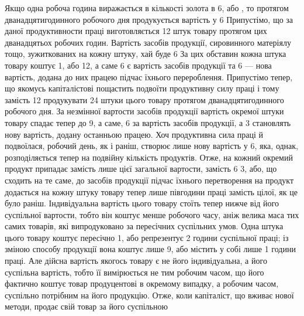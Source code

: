 Якщо одна робоча година виражається в кількості золота
в 6, або , то протягом дванадцятигодинного
робочого дня продукується вартість у 6 Припустімо, що
за даної продуктивности праці виготовляється 12 штук товару
протягом цих дванадцятьох робочих годин. Вартість засобів продукції,
сировинного матеріялу тощо, зужиткованих на кожну
штуку, хай буде 6 За цих обставин кожна штука товару
коштує 1, або 12, а саме 6 є вартість засобів
продукції та 6 — нова вартість, додана до них працею
підчас їхнього перероблення. Припустімо тепер, що якомусь
капіталістові пощастить подвоїти продуктивну силу праці і тому
замість 12 продукувати 24 штуки цього товару протягом дванадцятигодинного
робочого дня. За незмінної вартости засобів
продукції вартість окремої штуки товару спадає тепер до 9,
 а саме, 6 за вартість засобів продукції, а 3 становлять
нову вартість, додану останньою працею. Хоч продуктивна
сила праці й подвоїлася, робочий день, як і раніш, створює
лише нову вартість у 6, яка, однак, розподіляється
тепер на подвійну кількість продуктів. Отже, на кожний окремий
продукт припадає замість  лише  цієї загальної вартости,
замість 6 3, або, що сходить на те саме, до засобів
продукції підчас їхнього перетворення на продукт додається на
кожну штуку товару тепер лише півгодини праці замість цілої,
як це було раніш. Індивідуальна вартість цього товару стоїть
тепер нижче від його суспільної вартости, тобто він коштує менше
робочого часу, аніж велика маса тих самих товарів, які випродуковано
за пересічних суспільних умов. Одна штука цього товару
коштує пересічно 1, або репрезентує 2 години суспільної
праці; із зміною способу продукції вона коштує лише 9,
або містить у собі лише 1 години праці. Але дійсна вартість
якогось товару є не його індивідуальна, а його суспільна вартість,
тобто її вимірюється не тим робочим часом, що його фактично
коштує товар продуцентові в окремому випадку, а робочим часом,
суспільно потрібним на його продукцію. Отже, коли капіталіст,
що вживає нової методи, продає свій товар за його суспільною
\parbreak{}  %
